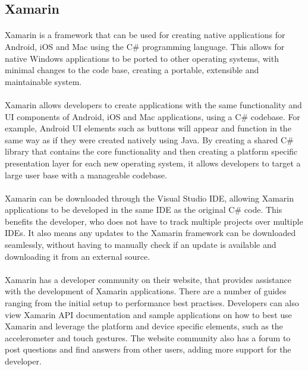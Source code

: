 	\subsection{Xamarin}
		\paragraph{}{
		Xamarin is a framework that can be used for creating native applications for Android, iOS and Mac using the C{\#} programming language. This allows for native Windows applications to be ported to other operating systems, with minimal changes to the code base, creating a portable, extensible and maintainable system.
		}
		\paragraph{}{
		Xamarin allows developers to create applications with the same functionality and UI components of Android, iOS and Mac applications, using a C{\#} codebase. For example, Android UI elements such as buttons will appear and function in the same way as if they were created natively using Java. By creating a shared C{\#} library that contains the core functionality and then creating a platform specific presentation layer for each new operating system, it allows developers to target a large user base with a manageable codebase. 
		}
		\paragraph{}{
		Xamarin can be downloaded through the Visual Studio IDE, allowing Xamarin applications to be developed in the same IDE as the original C{\#} code. This benefits the developer, who does not have to track multiple projects over multiple IDEs. It also means any updates to the Xamarin framework can be downloaded seamlessly, without having to manually check if an update is available and downloading it from an external source. 
		}
		\paragraph{}{
		Xamarin has a developer community on their website, that provides assistance with the development of Xamarin applications. There are a number of guides ranging from the initial setup to performance best practises. Developers can also view Xamarin API documentation and sample applications on how to best use Xamarin and leverage the platform and device specific elements, such as the accelerometer and touch gestures. The website community also has a forum to post questions and find answers from other users, adding more support for the developer.
		}	
